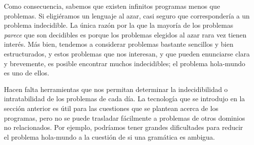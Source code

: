 Como consecuencia, sabemos que existen infinitos programas menos que problemas. Si eligiéramos un lenguaje al azar, casi seguro que correspondería a un problema indecidible. La única razón por la que la mayoría de los problemas \emph{parece} que son decidibles es porque los problemas elegidos al azar rara vez tienen interés. Más bien, tendemos a considerar problemas bastante sencillos y bien estructurados, y estos problemas que nos interesan, y que pueden enunciarse clara y brevemente, es posible encontrar muchos indecidibles; el problema hola-mundo es uno de ellos.\\


Hacen falta herramientas que nos permitan determinar la indecidibilidad  o intratabilidad de los problemas de cada día. La tecnología que se introdujo en la sección anterior es útil para las cuestiones que se plantean acerca de los programas, pero no se puede trasladar fácilmente a problemas de otros dominios no relacionados. Por ejemplo, podríamos tener grandes dificultades para reducir el problema hola-mundo a la cuestión de si una gramática es ambigua.\\

